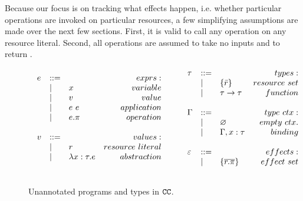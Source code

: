 Because our focus is on tracking what effects happen, i.e. whether
particular operations are invoked on particular resources, a few simplifying
assumptions are made over the next few sections. First, it is valid to call
any operation on any resource literal. Second, all operations are assumed
to take no inputs and to return .

\begin{figure}

\vspace{-0.6cm}
\[
\begin{array}{lll}

\begin{array}{lllr}
e & ::= & ~ & exprs: \\
	& | & x & variable \\
	& | & v & value \\
	& | & e ~ e & application \\
	& | & e.\pi & operation \\
	&&\\

v & ::= & ~ & values: \\
	& | & r & resource~literal \\
	& | & \lambda x: \tau.e & abstraction \\
	&&\\
\end{array}

\hspace{5ex}

\begin{array}{lllr}

\tau & ::= & ~ & types: \\
		& | & \{ \bar r \} & resource~set \\
		& | & \tau \rightarrow \tau & function\\ 
		&&\\

\Gamma & ::= & ~ & type~ctx: \\
				& | & \varnothing & empty~ctx.\\
				& | & \Gamma, x: \tau & binding\\
				&&\\
				
\varepsilon & ::= & ~ & effects: \\
		& | & \{ \overline{r.\pi} \} & effect~set \\
		&&\\

				
\end{array}

\end{array}
\]
\vspace{-0.6cm}
\caption{Unannotated programs and types in $\mathtt{CC}$.}
\vspace{-0.6cm}
\label{fig:epscalc_unannotated_grammar}
\end{figure}

